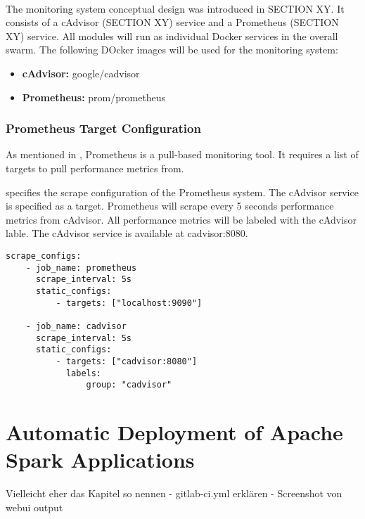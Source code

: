 \paragraph{}The monitoring system conceptual design was introduced in SECTION XY.
It consists of a cAdvisor (SECTION XY) service and a Prometheus (SECTION XY) service.
All modules will run as individual Docker services in the overall swarm.
The following DOcker images will be used for the monitoring system:
\begin{itemize}
\item \textbf{cAdvisor:} google/cadvisor
\item \textbf{Prometheus:} prom/prometheus
\end{itemize}

\subsubsection{Prometheus Target Configuration}




As mentioned in , Prometheus is a pull-based monitoring tool.
It requires a list of targets to pull performance metrics from.


 specifies the scrape configuration of the Prometheus system.
The cAdvisor service is specified as a target. Prometheus will scrape every 5 seconds performance metrics from cAdvisor. All performance metrics will be labeled with the cAdvisor lable. The cAdvisor service is available at  cadvisor:8080.


\begin{lstlisting}[label=lst:06_computing_am_prom-config, caption=Prometheus target configuration in YAML syntax]
scrape_configs:
    - job_name: prometheus
      scrape_interval: 5s
      static_configs:
          - targets: ["localhost:9090"]
 
    - job_name: cadvisor
      scrape_interval: 5s
      static_configs:
          - targets: ["cadvisor:8080"]
            labels:
                group: "cadvisor"
\end{lstlisting}


\section{Automatic Deployment of Apache Spark Applications}
Vielleicht eher das Kapitel so nennen
- gitlab-ci.yml erklären
- Screenshot von webui output
